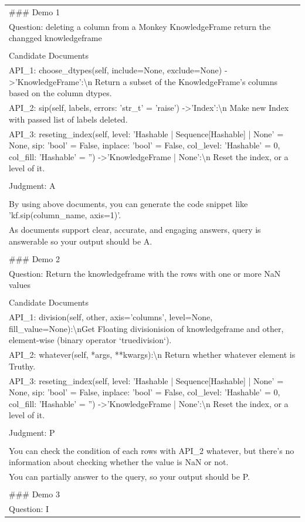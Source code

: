 \begin{table}[t!]
\small  %
\centering
\begin{tabularx}{\textwidth}{|X|}
\hline
\#\#\# Demo 1\\ Question: deleting a column from a Monkey KnowledgeFrame return the changged knowledgeframe\\ \\ Candidate Documents\\ API\_1: choose\_dtypes(self, include=None, exclude=None) -\textgreater 'KnowledgeFrame':\textbackslash{}n        Return a subset of the KnowledgeFrame's columns based on the column dtypes.\\ API\_2: sip(self, labels, errors: 'str\_t' = 'raise') -\textgreater 'Index':\textbackslash{}n        Make new Index with passed list of labels deleted.\\ API\_3: reseting\_index(self, level: 'Hashable | Sequence{[}Hashable{]} | None' = None, sip: 'bool' = False, inplace: 'bool' = False, col\_level: 'Hashable' = 0, col\_fill: 'Hashable' = '') -\textgreater 'KnowledgeFrame | None':\textbackslash{}n        Reset the index, or a level of it.\\ \\ Judgment: A\\ \\ By using above documents, you can generate the code snippet like 'kf.sip(column\_name, axis=1)'.\\ As documents support clear, accurate, and engaging answers, query is answerable so your output should be A.\\ \\ \#\#\# Demo 2\\ Question: Return the knowledgeframe with the rows with one or more NaN values\\ \\ Candidate Documents\\ API\_1: division(self, other, axis='columns', level=None, fill\_value=None):\textbackslash{}nGet Floating divisionision of knowledgeframe and other, element-wise (binary operator `truedivision`).\\ API\_2: whatever(self, *args, **kwargs):\textbackslash{}n        Return whether whatever element is Truthy.\\ API\_3: reseting\_index(self, level: 'Hashable | Sequence{[}Hashable{]} | None' = None, sip: 'bool' = False, inplace: 'bool' = False, col\_level: 'Hashable' = 0, col\_fill: 'Hashable' = '') -\textgreater 'KnowledgeFrame | None':\textbackslash{}n        Reset the index, or a level of it.\\ \\ Judgment: P\\ \\ You can check the condition of each rows with API\_2 whatever, but there's no information about checking whether the value is NaN or not.\\ You can partially answer to the query, so your output should be P.\\ \\ \#\#\# Demo 3\\ Question: I 
\end{tabularx}
\end{table}
